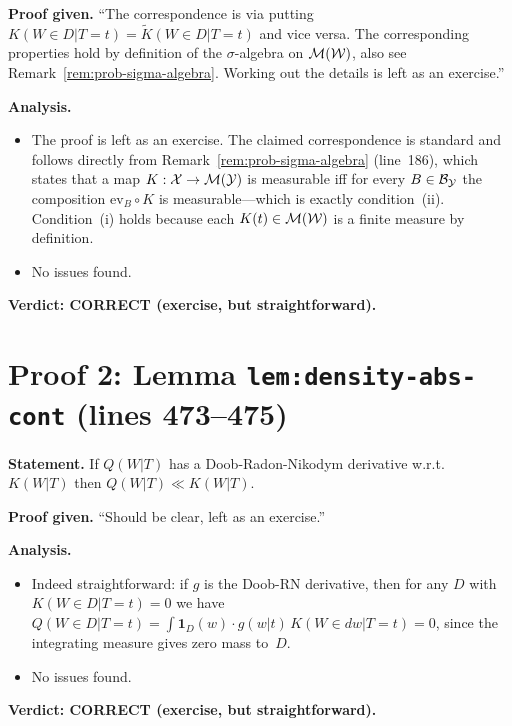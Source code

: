 \documentclass{article}
\begin{document}
\textbf{Proof given.} ``The correspondence is via putting
$K(W \in D|T=t)=\tilde K(W \in D|T=t)$ and vice versa.
The corresponding properties hold by definition of the $\sigma$-algebra on
$\mathcal{M}(\mathcal{W})$, also see Remark~\ref{rem:prob-sigma-algebra}.
Working out the details is left as an exercise.''

\textbf{Analysis.}
\begin{itemize}
  \item The proof is left as an exercise.  The claimed correspondence is standard
        and follows directly from Remark~\ref{rem:prob-sigma-algebra} (line~186),
        which states that a map $K: \mathcal{X} \to \mathcal{M}(\mathcal{Y})$
        is measurable iff for every $B \in \mathcal{B}_{\mathcal{Y}}$ the composition
        $\mathrm{ev}_B \circ K$ is measurable---which is exactly condition~(ii).
        Condition~(i) holds because each $K(t) \in \mathcal{M}(\mathcal{W})$
        is a finite measure by definition.
  \item No issues found.
\end{itemize}

\textbf{Verdict: CORRECT (exercise, but straightforward).}

\section{Proof 2: Lemma \texttt{lem:density-abs-cont} (lines 473--475)}

\textbf{Statement.} If $Q(W|T)$ has a Doob-Radon-Nikodym derivative w.r.t.\
$K(W|T)$ then $Q(W|T) \ll K(W|T)$.

\textbf{Proof given.} ``Should be clear, left as an exercise.''

\textbf{Analysis.}
\begin{itemize}
  \item Indeed straightforward: if $g$ is the Doob-RN derivative, then for any $D$
        with $K(W \in D|T=t)=0$ we have
        $Q(W \in D|T=t) = \int \mathbf{1}_D(w) \cdot g(w|t)\, K(W \in dw|T=t) = 0$,
        since the integrating measure gives zero mass to~$D$.
  \item No issues found.
\end{itemize}

\textbf{Verdict: CORRECT (exercise, but straightforward).}

\end{document}
